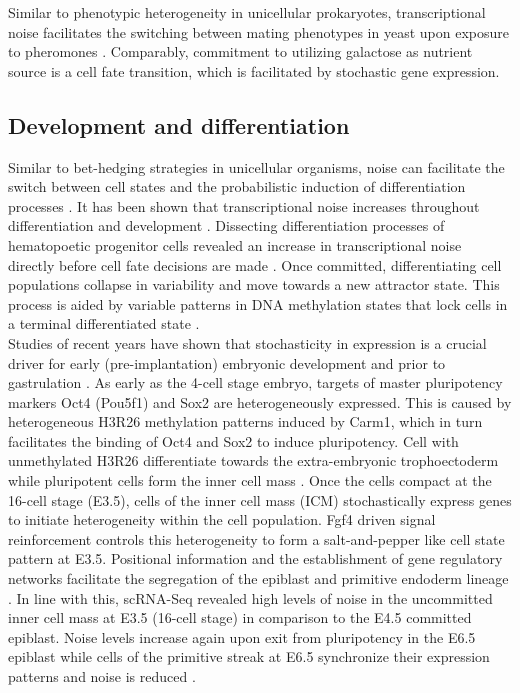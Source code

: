 Similar to phenotypic heterogeneity in unicellular prokaryotes, transcriptional noise facilitates the switching between mating phenotypes in yeast upon exposure to pheromones \citep{Paliwal2007}. Comparably, commitment to utilizing galactose as nutrient source is a cell fate transition, which is facilitated by stochastic gene expression\cite{Acar2008}. \\ 

\newpage

\subsection{Development and differentiation}

Similar to bet-hedging strategies in unicellular organisms, noise can facilitate the switch between cell states and the probabilistic induction of differentiation processes \citep{Eldar2010, Chang2008}. It has been shown that transcriptional noise increases throughout differentiation \citep{Stumpf2017} and development \citep{Antolovic2017}. Dissecting differentiation processes of hematopoetic progenitor cells revealed an increase in transcriptional noise directly before cell fate decisions are made \citep{Mojtahedi2016, Richard2016}. Once committed, differentiating cell populations collapse in variability and move towards a new attractor state. This process is aided by variable patterns in DNA methylation states that lock cells in a terminal differentiated state \citep{Jenkinson2017}. \\

Studies of recent years have shown that stochasticity in expression is a crucial driver for early (pre-implantation) embryonic development and prior to gastrulation \citep{Dietrich2007}. As early as the 4-cell stage embryo, targets of master pluripotency markers Oct4 (Pou5f1) and Sox2 are heterogeneously expressed.  This is caused by heterogeneous H3R26 methylation patterns induced by Carm1, which in turn facilitates the binding of Oct4 and Sox2 to induce pluripotency. Cell with unmethylated H3R26 differentiate towards the extra-embryonic trophoectoderm while pluripotent cells form the inner cell mass \citep{Goolam2016}. Once the cells compact at the 16-cell stage (E3.5), cells of the inner cell mass (ICM) stochastically express genes to initiate heterogeneity within the cell population. Fgf4 driven signal reinforcement controls this heterogeneity to form a salt-and-pepper like cell state pattern at E3.5. Positional information and the establishment of gene regulatory networks facilitate the segregation of the epiblast and primitive endoderm lineage \citep{Ohnishi2014}. In line with this, scRNA-Seq revealed high levels of noise in the uncommitted inner cell mass at E3.5 (16-cell stage) in comparison to the E4.5 committed epiblast. Noise levels increase again upon exit from pluripotency in the E6.5 epiblast while cells of the primitive streak at E6.5 synchronize their expression patterns and noise is reduced \citep{Mohammed2017}.\\


